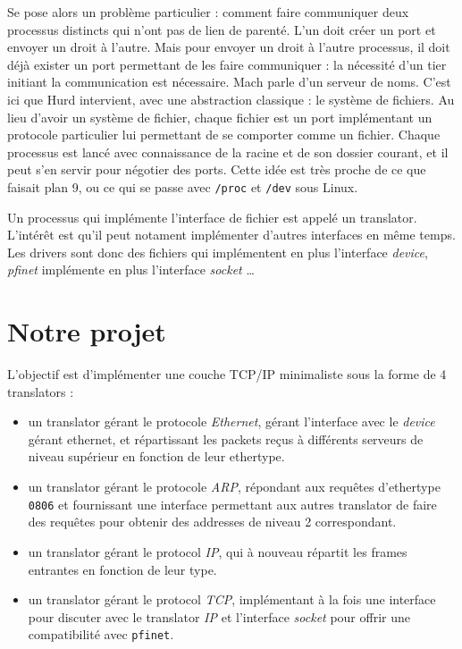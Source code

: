 \documentclass{article}
\begin{document}
Se pose alors un problème particulier : comment faire communiquer deux processus
distincts qui n'ont pas de lien de parenté. L'un doit créer un port et envoyer
un droit à l'autre. Mais pour envoyer un droit à l'autre processus, il doit
déjà exister un port permettant de les faire communiquer : la nécessité d'un
tier initiant la communication est nécessaire. Mach parle d'un serveur de noms.
C'est ici que Hurd intervient, avec une abstraction classique : le système de
fichiers. Au lieu d'avoir un système de fichier, chaque fichier est un port implémentant
un protocole particulier lui permettant de se comporter comme un fichier.
Chaque processus est lancé avec connaissance de la racine et de son dossier courant,
et il peut s'en servir pour négotier des ports. Cette idée est très proche de
ce que faisait plan 9, ou ce qui se passe avec \texttt{/proc} et \texttt{/dev}
sous Linux.

Un processus qui implémente l'interface de fichier est appelé un translator.
L'intérêt est qu'il peut notament implémenter d'autres interfaces en même temps.
Les drivers sont donc des fichiers qui implémentent en plus l'interface \emph{device},
\emph{pfinet} implémente en plus l'interface \emph{socket} \ldots

\section{Notre projet}

L'objectif est d'implémenter une couche TCP/IP minimaliste sous la forme de
4 translators :\begin{itemize}
    \item un translator gérant le protocole \emph{Ethernet}, gérant l'interface
        avec le \emph{device} gérant ethernet, et répartissant les packets
        reçus à différents serveurs de niveau supérieur en fonction de leur
        ethertype.
    \item un translator gérant le protocole \emph{ARP}, répondant aux requêtes
        d'ethertype \texttt{0806} et fournissant une interface permettant aux
        autres translator de faire des requêtes pour obtenir des addresses de
        niveau 2 correspondant.
    \item un translator gérant le protocol \emph{IP}, qui à nouveau répartit
        les frames entrantes en fonction de leur type.
    \item un translator gérant le protocol \emph{TCP}, implémentant à la fois
        une interface pour discuter avec le translator \emph{IP} et l'interface
        \emph{socket} pour offrir une compatibilité avec \texttt{pfinet}.
\end{itemize}
\end{document}
